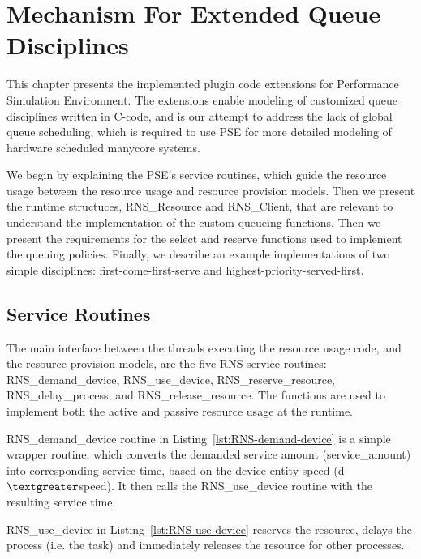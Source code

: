 \chapter{Mechanism For Extended Queue Disciplines}
\label{chapter:mechanism-for-extended-queue-disciplines}

This chapter presents the implemented plugin code extensions for Performance Simulation Environment. The extensions enable modeling of customized queue disciplines written in C-code, and is our attempt to address the lack of global queue scheduling, which is required to use PSE for more detailed modeling of hardware scheduled manycore systems.

We begin by explaining the PSE's service routines, which guide the resource usage between the resource usage and resource provision models. Then we present the runtime structuces, RNS\_Resource and RNS\_Client, that are relevant to understand the implementation of the custom queueing functions. Then we present the requirements for the select and reserve functions used to implement the queuing policies. Finally, we describe an example implementations of two simple disciplines: first-come-first-serve and highest-priority-served-first.

\section{Service Routines}
The main interface between the threads executing the resource usage code, and the resource provision models, are the five RNS service routines: RNS\_demand\_device, RNS\_use\_device, RNS\_reserve\_resource, RNS\_delay\_process, and RNS\_release\_resource. The functions are used to implement both the active and passive resource usage at the runtime.



RNS\_demand\_device routine in Listing~\ref{lst:RNS-demand-device} is a simple wrapper routine, which converts the demanded service amount (service\_amount) into corresponding service time, based on the device entity speed (d-$\textgreater$speed). It then calls the RNS\_use\_device routine with the resulting service time.



RNS\_use\_device in Listing~\ref{lst:RNS-use-device} reserves the resource, delays the process (i.e. the task) and immediately releases the resource for other processes.

